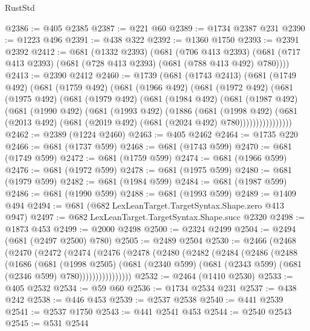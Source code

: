 \begin{lexlean}{RustStd}
\begin{coremodule}
@2386 := @405 @2385
@2387 := @221 @60
@2389 := @1734 @2387 @231
@2390 := @1223 @496
@2391 := @438 @322
@2392 := @1360 @1750
@2393 := @2391 @2392
@2412 := @681
    (@1332 @2393)
    (@681
      (@706 @413 @2393)
      (@681 (@717 @413 @2393) (@681 (@728 @413 @2393) (@681 (@788 @413 @492) @780))))
@2413 := @2390 @2412
@2460 := @1739
    (@681
      (@1743 @2413)
      (@681
        (@1749 @492)
        (@681
          (@1759 @492)
          (@681
            (@1966 @492)
            (@681
              (@1972 @492)
              (@681
                (@1975 @492)
                (@681
                  (@1979 @492)
                  (@681
                    (@1984 @492)
                    (@681
                      (@1987 @492)
                      (@681
                        (@1990 @492)
                        (@681
                          (@1993 @492)
                          (@1886
                            (@681
                              (@1998 @492)
                              (@681
                                (@2013 @492)
                                (@681 (@2019 @492) (@681 (@2024 @492) @780))))))))))))))))
@2462 := @2389 (@1224 @2460)
@2463 := @405 @2462
@2464 := @1735 @220
@2466 := @681 (@1737 @599)
@2468 := @681 (@1743 @599)
@2470 := @681 (@1749 @599)
@2472 := @681 (@1759 @599)
@2474 := @681 (@1966 @599)
@2476 := @681 (@1972 @599)
@2478 := @681 (@1975 @599)
@2480 := @681 (@1979 @599)
@2482 := @681 (@1984 @599)
@2484 := @681 (@1987 @599)
@2486 := @681 (@1990 @599)
@2488 := @681 (@1993 @599)
@2489 := @1409 @494
@2494 := @681 (@682 LexLeanTarget.TargetSyntax.Shape.zero @413 @947)
@2497 := @682 LexLeanTarget.TargetSyntax.Shape.succ @2320
@2498 := @1873 @453
@2499 := @2000 @2498
@2500 := @2324 @2499
@2504 := @2494 (@681 (@2497 @2500) @780)
@2505 := @2489 @2504
@2530 := @2466
    (@2468
      (@2470
        (@2472
          (@2474
            (@2476
              (@2478
                (@2480
                  (@2482
                    (@2484
                      (@2486
                        (@2488
                          (@1686
                            (@681
                              (@1998 @2505)
                              (@681
                                (@2340 @599)
                                (@681 (@2343 @599) (@681 (@2346 @599) @780))))))))))))))))
@2532 := @2464 (@1410 @2530)
@2533 := @405 @2532
@2534 := @59 @60
@2536 := @1734 @2534 @231
@2537 := @438 @242
@2538 := @446 @453
@2539 := @2537 @2538
@2540 := @441 @2539
@2541 := @2537 @1750
@2543 := @441 @2541 @453
@2544 := @2540 @2543
@2545 := @531 @2544

\end{coremodule}
\end{lexlean}
